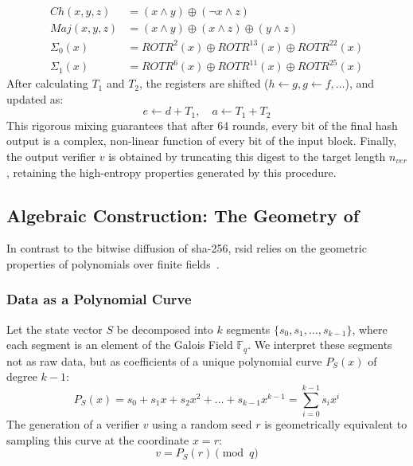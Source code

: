 \begin{align}
    Ch(x, y, z) &= (x \land y) \oplus (\neg x \land z) \\
    Maj(x, y, z) &= (x \land y) \oplus (x \land z) \oplus (y \land z) \\
    \Sigma_0(x) &= ROTR^{2}(x) \oplus ROTR^{13}(x) \oplus ROTR^{22}(x) \\
    \Sigma_1(x) &= ROTR^{6}(x) \oplus ROTR^{11}(x) \oplus ROTR^{25}(x)
\end{align}
After calculating $T_1$ and $T_2$, the registers are shifted ($h \leftarrow g, g \leftarrow f, \dots$), and updated as:
\begin{equation}
    e \leftarrow d + T_1, \quad a \leftarrow T_1 + T_2
\end{equation}
This rigorous mixing guarantees that after 64 rounds, every bit of the final hash output is a complex, non-linear function of every bit of the input block. Finally, the output verifier $v$ is obtained by truncating this digest to the target length $n_{ver}$, retaining the high-entropy properties generated by this procedure.


\subsection[Algebraic Construction: The Geometry of RS-ID]{Algebraic Construction: The Geometry of }
\label{subsec:rsid_geometry}
In contrast to the bitwise diffusion of \gls{sha}-256, \gls{rsid} relies on the geometric properties of polynomials over finite fields~\cite{schwartz1980fast}.

\subsubsection{Data as a Polynomial Curve}
Let the state vector $S$ be decomposed into $k$ segments $\{s_0, s_1, \dots, s_{k-1}\}$, where each segment is an element of the Galois Field $\mathbb{F}_q$. We interpret these segments not as raw data, but as coefficients of a unique polynomial curve $P_S(x)$ of degree $k-1$:
\begin{equation}
    P_S(x) = s_0 + s_1 x + s_2 x^2 + \dots + s_{k-1} x^{k-1} = \sum_{i=0}^{k-1} s_i x^i
\end{equation}
The generation of a verifier $v$ using a random seed $r$ is geometrically equivalent to sampling this curve at the coordinate $x=r$:
\begin{equation}
    v = P_S(r) \pmod q
\end{equation}


